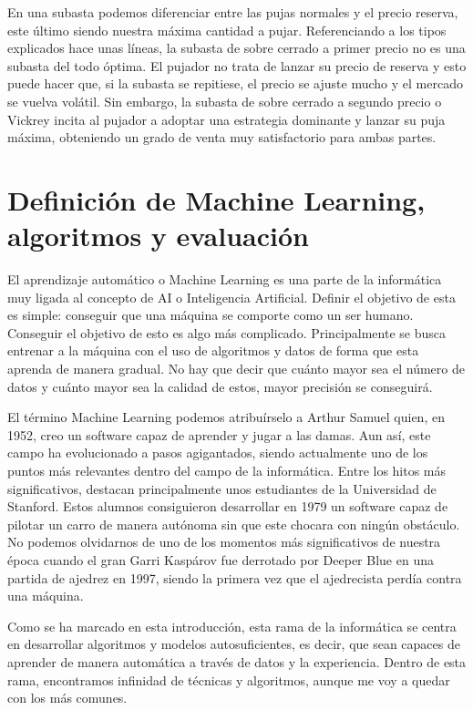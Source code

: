 	En una subasta podemos diferenciar entre las pujas normales y el precio reserva, este último siendo nuestra máxima cantidad a pujar. Referenciando a los tipos explicados hace unas líneas, la subasta de sobre cerrado a primer precio no es una subasta del todo óptima. El pujador no trata de lanzar su precio de reserva y esto puede hacer que, si la subasta se repitiese, el precio se ajuste mucho y el mercado se vuelva volátil. Sin embargo, la subasta de sobre cerrado a segundo precio o Vickrey incita al pujador a adoptar una estrategia dominante y lanzar su puja máxima, obteniendo un grado de venta muy satisfactorio para ambas partes.
	
	

\section{Definición de Machine Learning, algoritmos y evaluación}

	El aprendizaje automático o Machine Learning es una parte de la informática muy ligada al concepto de AI o Inteligencia Artificial. Definir el objetivo de esta es simple: conseguir que una máquina se comporte como un ser humano. Conseguir el objetivo de esto es algo más complicado. Principalmente se busca entrenar a la máquina con el uso de algoritmos y datos de forma que esta aprenda de manera gradual. No hay que decir que cuánto mayor sea el número de datos y cuánto mayor sea la calidad de estos, mayor precisión se conseguirá. 
	
	El término Machine Learning podemos atribuírselo a Arthur Samuel quien, en 1952, creo un software capaz de aprender y jugar a las damas. Aun así, este campo ha evolucionado a pasos agigantados, siendo actualmente uno de los puntos más relevantes dentro del campo de la informática. Entre los hitos más significativos, destacan principalmente unos estudiantes de la Universidad de Stanford. Estos alumnos consiguieron desarrollar en 1979 un software capaz de pilotar un carro de manera autónoma sin que este chocara con ningún obstáculo.  No podemos olvidarnos de uno de los momentos más significativos de nuestra época cuando el gran Garri Kaspárov fue derrotado por Deeper Blue en una partida de ajedrez en 1997, siendo la primera vez que el ajedrecista perdía contra una máquina.
	
	Como se ha marcado en esta introducción, esta rama de la informática se centra en desarrollar algoritmos y modelos autosuficientes, es decir, que sean capaces de aprender de manera automática a través de datos y la experiencia. Dentro de esta rama, encontramos infinidad de técnicas y algoritmos, aunque me voy a quedar con los más comunes.
	
